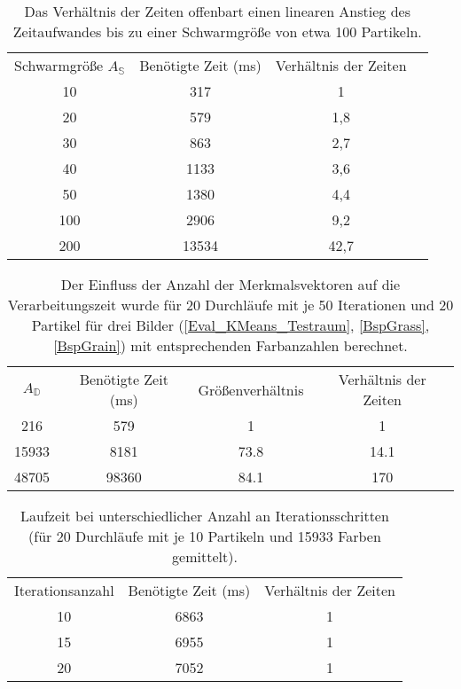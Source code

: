   \begin{table}
    \begin{center}
      \begin{tabular}{cccc}
  	Schwarmgröße $A_\mathbb{S}$ & Benötigte Zeit (ms) & Verhältnis der Zeiten\\
	10 & 317 & 1\\
	20 & 579 & 1,8\\
	30 & 863 & 2,7\\
	40 & 1133 & 3,6\\
	50 & 1380 & 4,4\\
	100 & 2906 & 9,2\\
	200 & 13534 & 42,7\\
      \end{tabular}
    \end{center}
    \caption{Das Verhältnis der Zeiten offenbart einen linearen Anstieg des Zeitaufwandes bis zu einer Schwarmgröße von etwa 100 Partikeln.}
    \label{table:TabSchwarmgroesse}
  \end{table}

  \begin{table}
    \begin{center}
      \begin{tabular}{cccc}
  	$A_\mathbb{D}$ & Benötigte Zeit (ms) & Größenverhältnis &  Verhältnis der Zeiten\\
	216 & 579 & 1 & 1\\
	15933 & 8181 & 73.8 & 14.1\\
	48705 & 98360 & 84.1 & 170 \\
      \end{tabular}
    \end{center}
    \caption{Der Einfluss der Anzahl der Merkmalsvektoren auf die Verarbeitungszeit wurde für 20 Durchläufe mit je 50 Iterationen und 20 Partikel für drei Bilder (\ref{Eval_KMeans_Testraum}, \ref{BspGrass}, \ref{BspGrain}) mit entsprechenden Farbanzahlen berechnet.}
    \label{table:TabProblemgroesse}
  \end{table}
  
  \begin{table}
    \begin{center}
      \begin{tabular}{ccc}
  	Iterationsanzahl & Benötigte Zeit (ms) & Verhältnis der Zeiten\\
	10 & 6863 & 1\\
	15 & 6955 & 1\\
	20 & 7052 & 1	 
      \end{tabular}
    \end{center}
    \caption{Laufzeit bei unterschiedlicher Anzahl an Iterationsschritten (für 20 Durchläufe mit je 10 Partikeln und 15933 Farben gemittelt).}
    \label{table:TabIterPSO}
  \end{table}

